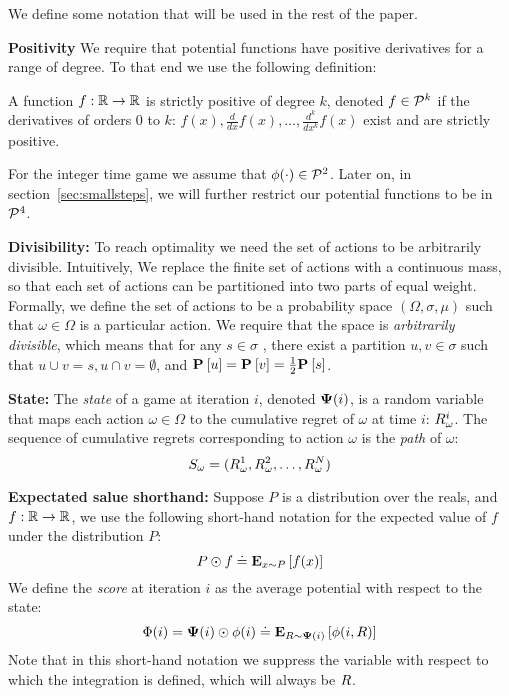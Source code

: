 \documentclass{article}[12pt]
\begin{document}
We define some notation that will be used in the rest of the paper.

{\bf Positivity}
We require that potential functions have positive derivatives for a
range of degree. To that end we use the following definition:
\begin{definition}
A function $f:\reals \to \reals$ is strictly positive of degree $k$, 
denoted $f \in \SP{k}$ if the derivatives of orders 0 to $k$:  
$f(x), \frac{d}{dx}f(x), \ldots, \frac{d^k}{dx^k}f(x)$ exist and are strictly positive.
\end{definition}
For the integer time game we assume that $\pot(\cdot) \in
\SP{2}$. Later on, in section~\ref{sec:smallsteps}, we will further
restrict our potential functions to be in $\SP{4}$.

{\bf Divisibility:} To reach optimality we need the set of actions to
be arbitrarily divisible. Intuitively, We replace the finite set of
actions with a continuous mass, so that each set of actions can be
partitioned into two parts of equal weight.  Formally, we define the
set of actions to be a probability space $(\Omega,\sigma,\mu)$ such
that $\omega \in \Omega$ is a particular action. We require that the
space is {\em arbitrarily divisible}, which means that for any
$s \in \sigma$ , there exist a partition $u,v \in \sigma$ such that
$u \cup v = s, u \cap v = \emptyset$, and
$\P{}{u}=\P{}{v}=\frac{1}{2} \P{}{s}$.

{\bf State:} The {\em state} of a game at iteration $i$, denoted $\state(i)$, is
a random variable that maps each action $\omega \in \Omega$ to the
cumulative regret of $\omega$ at time $i$: $\R_\omega^i$. The sequence
of cumulative regrets corresponding to action $\omega$ is the {\em
  path} of $\omega$:
\begin{equation} \label{eqn:path}
  S_{\omega}=(\R_\omega^1,\R_\omega^2,\ldots,\R_\omega^N)
\end{equation}

{\bf Expectated salue shorthand:} Suppose $P$ is a distribution over the reals, and $f:\reals
\to \reals$, we use the following short-hand notation for the expected
value of $f$ under the distribution $P$:
\[ P \odot f \doteq \E{x \sim P}{f(x)}  \]
We define the {\em score} at iteration $i$ as the average potential
with respect to the state:
\[ \score(i) = \state(i) \odot \pot(i) \doteq \E{\R \sim \state(i)}{\pot(i,\R)}\]
Note that in this short-hand notation we suppress the variable with
respect to which the integration is defined, which will always be $\R$.
\end{document}
